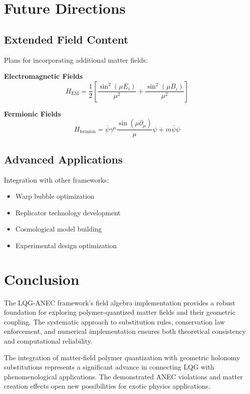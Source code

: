 \documentclass[11pt]{article}
\begin{document}
\section{Future Directions}

\subsection{Extended Field Content}

Plans for incorporating additional matter fields:

\textbf{Electromagnetic Fields}
\begin{equation}
H_{\text{EM}} = \frac{1}{2}\left[\frac{\sin^2(\mu E_i)}{\mu^2} + \frac{\sin^2(\mu B_i)}{\mu^2}\right]
\end{equation}

\textbf{Fermionic Fields}
\begin{equation}
H_{\text{fermion}} = \bar{\psi}\gamma^\mu \frac{\sin(\mu \partial_\mu)}{\mu}\psi + m\bar{\psi}\psi
\end{equation}

\subsection{Advanced Applications}

Integration with other frameworks:
\begin{itemize}
\item Warp bubble optimization
\item Replicator technology development  
\item Cosmological model building
\item Experimental design optimization
\end{itemize}

\section{Conclusion}

The LQG-ANEC framework's field algebra implementation provides a robust foundation for exploring polymer-quantized matter fields and their geometric coupling. The systematic approach to substitution rules, conservation law enforcement, and numerical implementation ensures both theoretical consistency and computational reliability.

The integration of matter-field polymer quantization with geometric holonomy substitutions represents a significant advance in connecting LQG with phenomenological applications. The demonstrated ANEC violations and matter creation effects open new possibilities for exotic physics applications.
\end{document}

